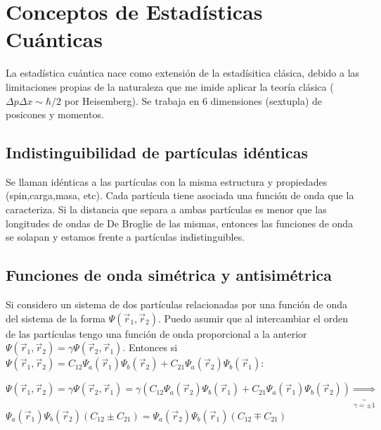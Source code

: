\documentclass[oneside]{book}
\numberwithin{equation}{section}
\numberwithin{figure}{section}
\numberwithin{table}{section}
\begin{document}
		\section{Conceptos de Estadísticas Cuánticas}	
		
					La estadística cuántica nace como extensión de la estadísitica clásica, debido a las limitaciones propias de la naturaleza que me imide aplicar la teoría clásica ($\Delta p \Delta x \sim \hbar/2$ por Heisemberg). Se trabaja en 6 dimensiones (sextupla) de posicones y momentos.\\
			
				\subsection{Indistinguibilidad de partículas idénticas}
				
					Se llaman idénticas a las partículas con la misma estructura y propiedades (spin,carga,masa, etc). Cada partícula tiene asociada una función de onda que la caracteriza. Si la distancia que separa a ambas partículas es menor que las longitudes de ondas de De Broglie de las mismas, entonces las funciones de onda se solapan y estamos frente a partículas indistinguibles.\\
				
				\subsection{Funciones de onda simétrica y antisimétrica}

					Si considero un sistema de dos partículas relacionadas por una función de onda del sistema de la forma $\displaystyle \Psi(\vec{r}_1,\vec{r}_2)$.  Puedo asumir que al intercambiar el orden de las partículas tengo una función de onda proporcional a la anterior  $\displaystyle \Psi(\vec{r}_1,\vec{r}_2)=\gamma \Psi(\vec{r}_2,\vec{r}_1)$. Entonces si $\displaystyle \Psi(\vec{r}_1,\vec{r}_2)=C_{12}\Psi_a(\vec{r}_1)\Psi_b(\vec{r}_2)+C_{21}\Psi_a(\vec{r}_2)\Psi_b(\vec{r}_1)$:\\
					
					\begin{center}
						$\displaystyle \Psi(\vec{r}_1,\vec{r}_2)=\gamma\Psi(\vec{r}_2,\vec{r}_1)=\gamma(C_{12}\Psi_a(\vec{r}_2)\Psi_b(\vec{r}_1)+C_{21}\Psi_a(\vec{r}_1)\Psi_b(\vec{r}_2)) \underbrace{\Rightarrow}_{\gamma= \pm 1}$\\
						$\displaystyle \Psi_a(\vec{r}_1)\Psi_b(\vec{r}_2)(C_{12} \pm C_{21})=\Psi_a(\vec{r}_2)\Psi_b(\vec{r}_1)(C_{12} \mp C_{21})$ 
					\end{center}
				
\end{document}
